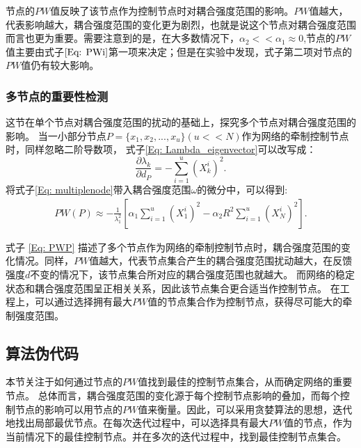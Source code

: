 节点的$ PW $值反映了该节点作为控制节点时对耦合强度范围的影响。$ PW $值越大，代表影响越大，耦合强度范围的变化更为剧烈，也就是说这个节点对耦合强度范围而言也更为重要。需要注意到的是，在大多数情况下，$ \alpha_2<<\alpha_1\approx0 $,节点的$ PW $值主要由式子$ \ref{Eq: PWi} $第一项来决定；但是在实验中发现，式子第二项对节点的$ PW $值仍有较大影响。

\subsubsection{多节点的重要性检测}

这节在单个节点对耦合强度范围的扰动的基础上，探究多个节点对耦合强度范围的影响。
当一小部分节点$ P=\{x_1,x_2,...,x_u\} (u<<N) $作为网络的牵制控制节点时，同样忽略二阶导数项，
式子\ref{Eq: Lambda_eigenvector}可以改写成：
\begin{equation}
\frac{\partial\lambda_k}{\partial{d_P}} = -\sum_{i=1}^{u}(X_k^{i})^2.
\label{Eq: multiplenode}
\end{equation}
将式子\ref{Eq: multiplenode}带入耦合强度范围$ \omega $的微分中，可以得到:
\begin{equation}
\begin{aligned}
PW(P) \approx  -\frac{1}{\lambda_1^2}[\alpha_1  \sum_{i=1}^{u}{(X_1^{i})^2}-\alpha_2 R^2 \sum_{i=1}^{u}{(X_N^{i})^2}].
\end{aligned}
\label{Eq: PWP}
\end{equation}

式子 \ref{Eq: PWP} 描述了多个节点作为网络的牵制控制节点时，耦合强度范围的变化情况。同样，$ PW $值越大，代表节点集合产生的耦合强度范围扰动越大，在反馈强度$ d $不变的情况下，该节点集合所对应的耦合强度范围也就越大。
而网络的稳定状态和耦合强度范围呈正相关关系，因此该节点集合更合适当作控制节点。
在工程上，可以通过选择拥有最大$ PW $值的节点集合作为控制节点，获得尽可能大的牵制强度范围。


\subsection{算法伪代码}

本节关注于如何通过节点的$ PW $值找到最佳的控制节点集合，从而确定网络的重要节点。
总体而言，耦合强度范围的变化源于每个控制节点影响的叠加，而每个控制节点的影响可以用节点的$ PW $值来衡量。因此，可以采用贪婪算法的思想，迭代地找出局部最优节点。在每次迭代过程中，可以选择具有最大$ PW $值的节点，作为当前情况下的最佳控制节点。并在多次的迭代过程中，找到最佳控制节点集合。

